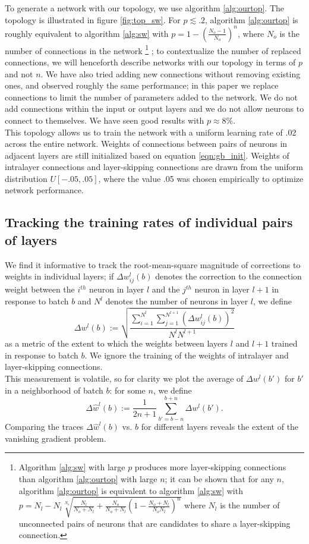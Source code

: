 \documentclass[format=sigconf]{acmart}
\newcommand{\npar}{\\\indent}
\begin{document}
To generate a network with our topology, we use algorithm \ref{alg:ourtop}. The topology is illustrated in figure \ref{fig:top_sw}. For $p\lesssim .2$, algorithm \ref{alg:ourtop} is roughly equivalent to algorithm \ref{alg:sw} with $p=1-(\frac{N_o-1}{N_o})^n$, where $N_o$ is the number of connections in the network
\footnote{Algorithm \ref{alg:sw} with large $p$ produces more layer-skipping connections than algorithm \ref{alg:ourtop} with large $n$; it can be shown that for any $n$, algorithm \ref{alg:ourtop} is equivalent to algorithm \ref{alg:sw} with ${p=N_l-N_l\sqrt[N_o]{\frac{N_l}{N_o+N_l}+\frac{N_o}{N_o+N_l}(1-\frac{N_o+N_l}{N_oN_l})^n}}$ where $N_l$ is the number of unconnected pairs of neurons that are candidates to share a layer-skipping connection.}
; to contextualize the number of replaced connections, we will henceforth describe networks with our topology in terms of $p$ and not $n$. We have also tried adding new connections without removing existing ones, and observed roughly the same performance; in this paper we replace connections to limit the number of parameters added to the network. We do not add connections within the input or output layers and we do not allow neurons to connect to themselves. We have seen good results with $p\approx 8\%$.
\npar
This topology allows us to train the network with a uniform learning rate of .02 across the entire network. Weights of connections between pairs of neurons in adjacent layers are still initialized based on equation \ref{eqn:gb_init}. Weights of intralayer connections and layer-skipping connections are drawn from the uniform distribution $U[-.05,.05]$, where the value .05 was chosen empirically to optimize network performance.

\subsection{Tracking the training rates of individual pairs of layers}

We find it informative to track the root-mean-square magnitude of corrections to weights in individual layers; if $\Delta w_{ij}^l(b)$ denotes the correction to the connection weight between the $i^{th}$ neuron in layer $l$ and the $j^{th}$ neuron in layer $l+1$ in response to batch $b$ and $N^l$ denotes the number of neurons in layer $l$, we define
\begin{equation}
\label{eqn:rms_correction}
\Delta w^l(b):=\sqrt{\frac{\sum_{i=1}^{N^l}\sum_{j=1}^{N^{l+1}}(\Delta w_{ij}^l(b))^2}{N^lN^{l+1}}}
\end{equation}
as a metric of the extent to which the weights between layers $l$ and $l+1$ trained in response to batch $b$. We ignore the training of the weights of intralayer and layer-skipping connections.
\npar
This measurement is volatile, so for clarity we plot the average of $\Delta w^l(b')$ for $b'$ in a neighborhood of batch $b$: for some $n$, we define
\begin{equation}
\label{eqn:running_avg}
\Delta \hat{w}^l(b):=\frac{1}{2n+1}\sum_{b'=b-n}^{b+n}\Delta w^l(b').
\end{equation}
Comparing the traces $\Delta \hat{w}^l(b)$ vs. $b$ for different layers reveals the extent of the vanishing gradient problem.
\end{document}
